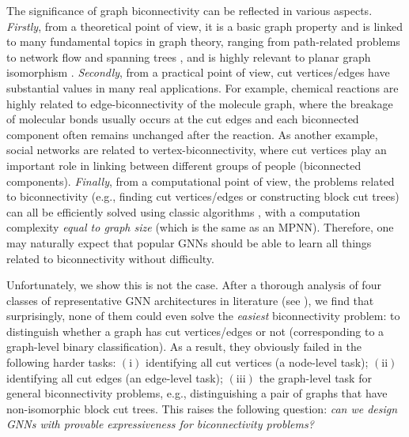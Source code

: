 \documentclass{article} %
\let\cref\crtcref
\begin{document}
The significance of graph biconnectivity can be reflected in various aspects. \emph{Firstly}, from a theoretical point of view, it is a basic graph property and is linked to many fundamental topics in graph theory, ranging from path-related problems to network flow \citep{granot1985substitutes} and spanning trees \citep{kapoor1995algorithms}, and is highly relevant to planar graph isomorphism \citep{hopcroft1972isomorphism}. %
\emph{Secondly}, from a practical point of view, cut vertices/edges have substantial values in many real applications. For example, chemical reactions are highly related to edge-biconnectivity of the molecule graph, where the breakage of molecular bonds usually occurs at the cut edges and each biconnected component often remains unchanged after the reaction. As another example, social networks are related to vertex-biconnectivity, where cut vertices play an important role in linking between different groups of people (biconnected components). 
\emph{Finally}, from a computational point of view, the problems related to biconnectivity (e.g., finding cut vertices/edges or constructing block cut trees) can all be efficiently solved using classic algorithms \citep{tarjan1972depth}, with a computation complexity \emph{equal to graph size} (which is the same as an MPNN). Therefore, one may naturally expect that popular GNNs should be able to learn all things related to biconnectivity without difficulty.


Unfortunately, we show this is not the case. After a thorough analysis of four classes of representative GNN architectures in literature (see \cref{sec:counterexamples}), we find that surprisingly, none of them could even solve the \emph{easiest} biconnectivity problem: to distinguish whether a graph has cut vertices/edges or not (corresponding to a graph-level binary classification). As a result, they obviously failed in the following harder tasks: $(\mathrm{i})$ identifying all cut vertices (a node-level task); $(\mathrm{ii})$ identifying all cut edges (an edge-level task); $(\mathrm{iii})$ the graph-level task for general biconnectivity problems, e.g., distinguishing a pair of graphs that have non-isomorphic block cut trees. This raises the following question: \emph{can we design GNNs with provable expressiveness for biconnectivity problems?}
\end{document}
